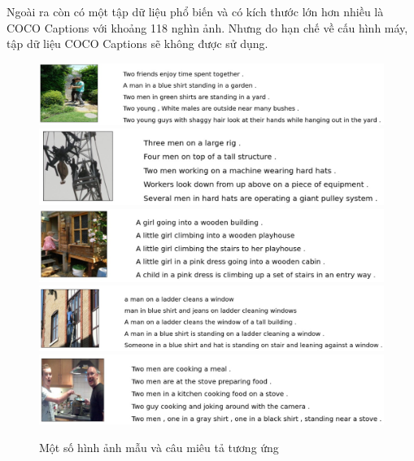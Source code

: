 \documentclass[14pt, a4paper]{article}
\numberwithin{equation}{section}
\numberwithin{algorithm}{section}
\numberwithin{figure}{section}
\numberwithin{table}{section}
\numberwithin{dl}{section}
\numberwithin{md}{section}
\numberwithin{bd}{section}
\numberwithin{dn}{section}
\numberwithin{hq}{section}
\begin{document}
    Ngoài ra còn có một tập dữ liệu phổ biến và có kích thước lớn hơn nhiều là COCO Captions với khoảng 118 nghìn ảnh.
    Nhưng do hạn chế về cấu hình máy, tập dữ liệu COCO Captions sẽ không được sử dụng.

    \begin{figure}[h!] \centering

        \includegraphics[scale=0.6]{Flickr_Sample_1.jpg}
        \includegraphics[scale=0.6]{Flickr_Sample_2.jpg}
        \includegraphics[scale=0.6]{Flickr_Sample_3.jpg}
        \includegraphics[scale=0.6]{Flickr_Sample_4.jpg}
        \includegraphics[scale=0.6]{Flickr_Sample_5.jpg}
        \caption{Một số hình ảnh mẫu và câu miêu tả tương ứng}
        \label{fig:Flickr30k-Sample-Image}

    \end{figure}
\end{document}
